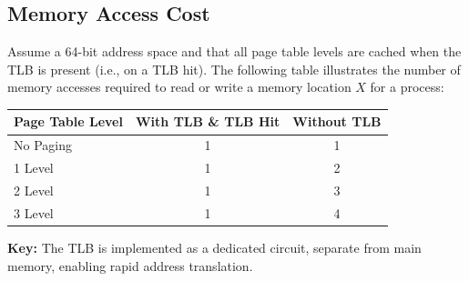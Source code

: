 \documentclass[../../compsys.tex]{subfiles}
\begin{document}
\subsection{Memory Access Cost}
Assume a 64-bit address space and that all page table levels are cached when the TLB is present (i.e., on a TLB hit). The following table illustrates the number of memory accesses required to read or write a memory location \(X\) for a process:

\begin{center}
\begin{tabular}{l|c|c}
    \toprule
    \textbf{Page Table Level} & \textbf{With TLB \& TLB Hit} & \textbf{Without TLB} \\
    \midrule
    No Paging & 1 & 1 \\
    1 Level   & 1 & 2 \\
    2 Level   & 1 & 3 \\
    3 Level   & 1 & 4 \\
    \bottomrule
\end{tabular}
\end{center}

\textbf{Key:} The TLB is implemented as a dedicated circuit, separate from main memory, enabling rapid address translation.
\newpage
\end{document}
